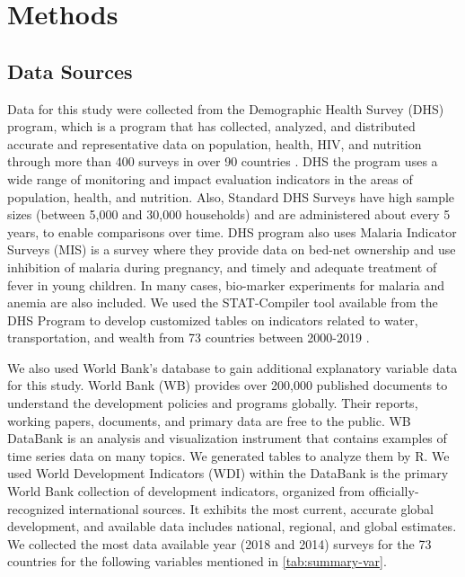 \documentclass[10pt,twoside]{article}
\numberwithin{equation}{section}
\newcommand{\?}{\stackrel{?}{=}}
\begin{document}
\section{Methods}
\subsection{Data Sources}
Data for this study were collected from the Demographic Health Survey (DHS) program, which is a program that has collected, analyzed, and distributed accurate and representative data on population, health, HIV, and nutrition through more than 400 surveys in over 90 countries \citep{statcompiler}. DHS the program uses a wide range of monitoring and impact evaluation indicators in the areas of population, health, and nutrition. Also, Standard DHS Surveys have high sample sizes (between 5,000 and 30,000 households) and are administered about every 5 years, to enable comparisons over time. DHS program also uses Malaria Indicator Surveys (MIS) is a survey where they provide data on bed-net ownership and use inhibition of malaria during pregnancy, and timely and adequate treatment of fever in young children. In many cases, bio-marker experiments for malaria and anemia are also included. We used the STAT-Compiler tool available from the DHS Program to develop customized tables on indicators related to water, transportation, and wealth from 73 countries between 2000-2019 \citep{statcompiler}.

We also used World Bank's database to gain additional explanatory variable data for this study. World Bank (WB) provides over 200,000 published documents to understand the development policies and programs globally. Their reports, working papers, documents, and primary data are free to the public. WB DataBank is an analysis and visualization instrument that contains examples of time series data on many topics. We generated tables to analyze them by R.  We used World Development Indicators (WDI) within the DataBank is the primary World Bank collection of development indicators, organized from officially-recognized international sources. It exhibits the most current, accurate global development, and available data includes national, regional, and global estimates. We collected the most data available year (2018 and 2014) surveys for the 73 countries for the following variables mentioned in \autoref{tab:summary-var}. 
\end{document}
